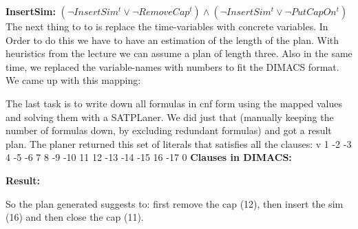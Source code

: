 \documentclass[11pt]{article}
\begin{document}
\noindent \textbf{InsertSim:}\newline
$
(\neg InsertSim^{t} \vee \neg RemoveCap^{t}) \wedge (\neg InsertSim^{t} \vee \neg PutCapOn^{t})
$\newline
\newpage\noindent
The next thing to to is replace the time-variables with concrete variables. In Order to do this we have to have an estimation of the length of the plan. With heuristics from the lecture we can assume a plan of length three. Also in the same time, we replaced the variable-names with numbers to fit the DIMACS format. We came up with this mapping:

The last task is to write down all formulas in cnf form using the mapped values and solving them with a SATPLaner. We did just that (manually keeping the number of formulas down, by excluding redundant formulas) and got a result plan. The planer returned this set of literals that satisfies all the clauses:
v 1 -2 -3 4 -5 -6 7 8 -9 -10 11 12 -13 -14 -15 16 -17 0 \newpage
\textbf{Clauses in DIMACS:}

\newpage
\textbf{Result:}

So the plan generated suggests to: first remove the cap (12), then insert the sim (16) and then close the cap (11). 
\end{document}
